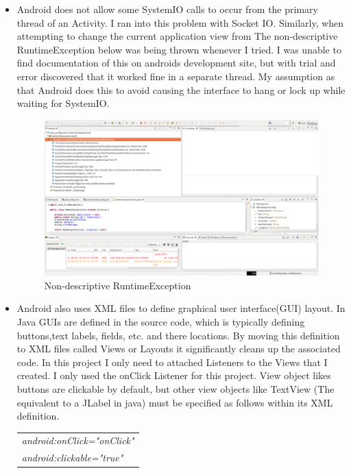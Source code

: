 \documentclass[12pt]{article}
\begin{document}
\begin{itemize}
\item Android does not allow some SystemIO calls to occur from the primary thread of an Activity.  I ran into this problem with Socket IO. Similarly, when attempting to change the current application view from  The non-descriptive RuntimeException below was being thrown whenever I tried. I was unable to find documentation of this on androids development site, but with trial and error discovered that it worked fine in a separate thread. My assumption as that Android does this to avoid causing the interface to hang or lock up while waiting for SystemIO. 
\begin{figure}[H]
\center
\includegraphics[width=1\textwidth]{runtimeexception.png}
\caption{Non-descriptive RuntimeException}
\end{figure}

\item Android also uses XML files to define graphical user interface(GUI) layout. In Java GUIs are defined in the source code, which is typically defining buttons,text labels, fields, etc. and there locations. By moving this definition to XML files called Views or Layouts it significantly cleans up the associated code. In this project I only need to attached Listeners to the Views that I created. I only used the onClick Listener for this project. View object likes buttons are clickable by default, but other view objects like TextView (The equivalent to a JLabel in java) must be specified as follows within its XML definition.
\begin{center}
\begin{tabular}{|l|}
\hline
\emph{    android:onClick="onClick"}\\  
\emph{    android:clickable="true"}\\
\hline
\end{tabular}
\end{center}


\end{itemize}
\end{document}
